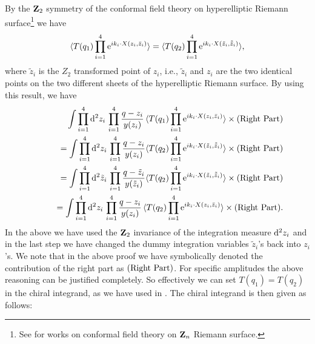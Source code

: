 \documentclass[a4paper,12pt]{article}
\begin{document}
By the ${\bf Z}_2$ symmetry of the conformal field theory on
hyperelliptic Riemann surface\footnote{See \cite{Dixon,
Zamolodchikov, Radul, Knizhnik2} for works on conformal field
theory on ${\bf Z}_n$ Riemann surface.} we have
\begin{equation}
\langle T(q_1) \prod_{i=1}^4 \hbox{e}^{i k_i \cdot X(z_i, \bar
z_i)} \rangle = \langle T(q_2) \prod_{i=1}^4 \hbox{e}^{i k_i \cdot
X(\tilde z_i, \tilde{\bar z}_i)} \rangle,
\end{equation}
where $\tilde z_i$ is the $Z_2$ transformed point of $z_i$, i.e.,
$\tilde z_i$ and $z_i$ are the two identical points on the two
different sheets of the hyperelliptic Riemann surface. By using
this result,  we have
\begin{eqnarray}
& & \int\prod_{i=1}^4 { {\rm d}^2 z_i } \, \prod_{i=1}^4{ q - z_i
\over y(z_i)} \,\langle T(q_1) \prod_{i=1}^4 \hbox{e}^{i k_i \cdot
X(z_i, \bar z_i)} \rangle \times (\hbox{Right Part}) \nonumber \\
& & \qquad = \int\prod_{i=1}^4 { {\rm d}^2 z_i } \, \prod_{i=1}^4{
q - z_i \over y(z_i)}\langle T(q_2) \prod_{i=1}^4 \hbox{e}^{i k_i
\cdot X(\tilde z_i, \tilde{\bar z}_i)} \rangle \times (\hbox{Right
Part}) \nonumber \\
& & \qquad = \int\prod_{i=1}^4 { {\rm d}^2 \tilde z_i } \,
\prod_{i=1}^4{ q - \tilde z_i \over y(\tilde z_i)}\langle T(q_2)
\prod_{i=1}^4 \hbox{e}^{i k_i \cdot X(\tilde z_i, \tilde{\bar
z}_i)} \rangle \times (\hbox{Right Part})
 \nonumber \\
& & \qquad = \int\prod_{i=1}^4 { {\rm d}^2 z_i } \, \prod_{i=1}^4{
q - z_i \over y(z_i)} \,\langle T(q_2) \prod_{i=1}^4 \hbox{e}^{i
k_i \cdot X(z_i, \bar z_i)} \rangle \times (\hbox{Right Part}) .
\end{eqnarray}
In the above we have used the ${\bf Z}_2$ invariance of the
integration measure ${\rm d}^2 z_i$ and in the last step we have
changed the dummy integration variables $\tilde z_i$'s back into
$z_i$'s. We note that in the above proof we have symbolically
denoted the contribution of the right part as $(\hbox{Right
Part})$. For specific amplitudes the above reasoning can be
justified completely. So effectively we can set $T(q_1) = T(q_2)$
in the chiral integrand, as we have used in \cite{AllZhu3}. The
chiral integrand is then given as follows:
\end{document}
